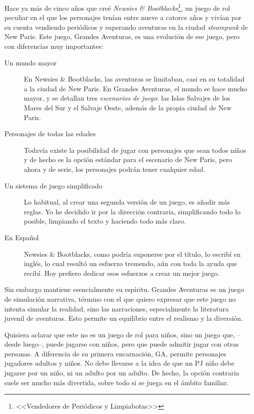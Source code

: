 

Hace ya más de cinco años que creé \emph{Newsies \& Bootblacks}\footnote{<<Vendedores de Periódicos y Limpiabotas>>}, un juego de rol peculiar en el que los personajes tenían entre nueve a catorce años y vivían por su cuenta vendiendo periódicos y superando aventuras en la ciudad \emph{steampunk} de New Paris. Este juego, Grandes Aventuras, es una evolución de ese juego, pero con diferencias muy importantes:

\begin{description}
\item[Un mundo mayor] En Newsies \& Bootblacks, las aventuras se limitaban, casi en su totalidad a la ciudad de New Paris. En Grandes Aventuras, el mundo se hace mucho mayor, y se detallan tres \emph{escenarios de juego}: las Islas Salvajes de los Mares del Sur y el Salvaje Oeste, además de la propia ciudad de New Paris.
\item[Personajes de todas las edades] Todavía existe la posibilidad de jugar con personajes que sean todos niños y de hecho es la opción estándar para el escenario de New Paris, pero ahora y de serie, los personajes podrán tener cualquier edad.
\item[Un sistema de juego simplificado] Lo habitual, al crear una segunda versión de un juego, es añadir más reglas. Yo he decidido ir por la dirección contraria, simplificando todo lo posible, limpiando el texto y haciendo todo más claro. 
\item[En Español] Newsies \& Bootblacks, como podría suponerse por el título, lo escribí en inglés, lo cual resultó un esfuerzo tremendo, aún con toda la ayuda que recibí. Hoy prefiero dedicar esos esfuerzos a crear un mejor juego.
\end{description}

Sin embargo mantiene esencialmente su espíritu. Grandes Aventuras es un juego de simulación narrativa, término con el que quiero expresar que este juego no intenta simular la realidad, sino las narraciones, especialmente la literatura juvenil de aventuras. Esto permite un equilibrio entre el realismo y la diversión.

Quisiera aclarar que este no es un juego de rol para niños, sino un juego que, --desde luego--, puede jugarse con niños, pero que puede admitir jugar con otras personas. A diferencia de su primera encarnación, GA, permite personajes jugadores adultos y niños. No debe llevarse a la idea de que un PJ niño debe jugarse por un niño, ni un adulto por un adulto. De hecho, la opción contraria suele ser mucho más divertida, sobre todo si se juega en el ámbito familiar.

